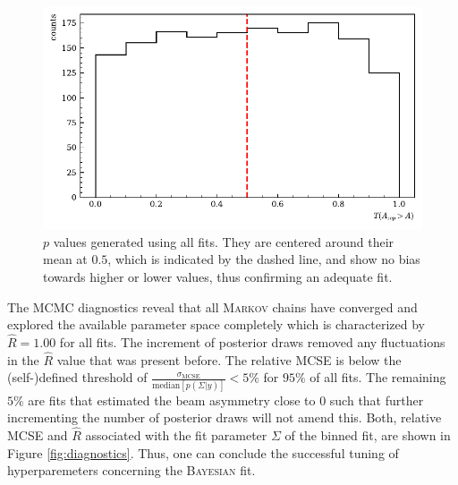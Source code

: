 \begin{figure}[htbp]
	\centering
	\includegraphics[width=\linewidth]{../bayes/realdeal/plots/pval_hist.pdf}
	\caption{$p$ values generated using all fits. They are centered around their mean at $0.5$, which is indicated by the dashed line, and show no bias towards higher or lower values, thus confirming an adequate fit.}
	\label{fig:pvals}
\end{figure}
The MCMC diagnostics reveal that all \textsc{Markov} chains have converged and explored the available parameter space completely which is characterized by $\widehat{R}=1.00$ for all fits. The increment of posterior draws removed any fluctuations in the $\widehat{R}$ value that was present before. The relative MCSE is below the (self-)defined threshold of $\frac{\sigma_\text{MCSE}}{\text{median}\left[p\left(\Sigma|y\right)\right]}<5\%$ for $95\%$ of all fits. The remaining $5\%$ are fits that estimated the beam asymmetry close to $0$ such that further incrementing the number of posterior draws will not amend this. Both, relative MCSE and $\widehat{R}$ associated with the fit parameter $\Sigma$ of the binned fit, are shown in Figure \ref{fig:diagnostics}. Thus, one can conclude the successful tuning of hyperparemeters concerning the \textsc{Bayesian} fit. 
